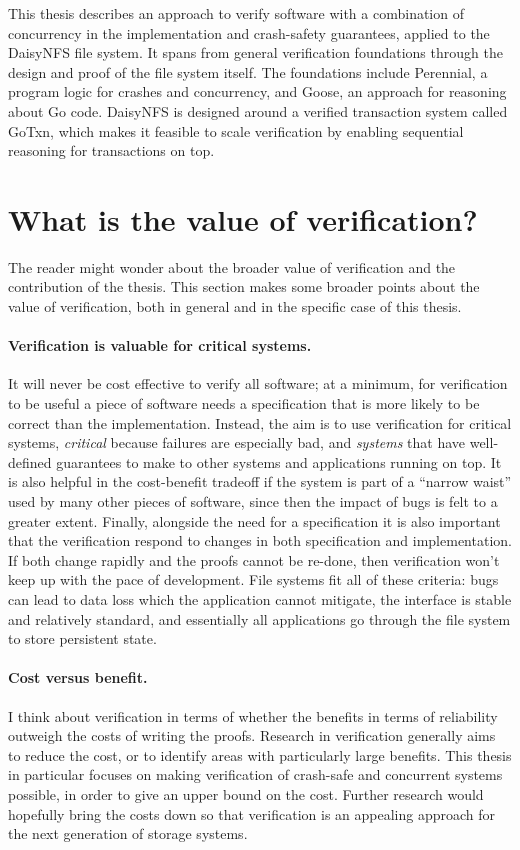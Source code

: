 This thesis describes an approach to verify software with a combination of
concurrency in the implementation and crash-safety guarantees, applied to the
DaisyNFS file system. It spans from general verification foundations
through the design and proof of the file system itself. The foundations
include Perennial, a program logic for crashes and concurrency, and Goose, an
approach for reasoning about Go code. DaisyNFS is designed around a verified
transaction system called GoTxn, which makes it feasible to scale verification
by enabling sequential reasoning for transactions on top.

\section{What is the value of verification?}

The reader might wonder about the broader value of verification and the
contribution of the thesis. This section makes some broader points about the
value of verification, both in general and in the specific case of this thesis.

\paragraph{Verification is valuable for critical systems.} It will never be cost
effective to verify all software; at a minimum, for verification to be useful a
piece of software needs a specification that is more likely to be correct than
the implementation.
Instead, the aim is to use verification for critical systems, \emph{critical}
because failures are especially bad, and \emph{systems} that have well-defined
guarantees to make to other systems and applications running on top. It is also
helpful in the cost-benefit tradeoff if the system is part of a ``narrow waist''
used by many other pieces of software, since then the impact of bugs is felt to
a greater extent. Finally, alongside the need for a specification it is also
important that the verification respond to changes in both specification and
implementation. If both change rapidly and the proofs cannot be re-done, then
verification won't keep up with the pace of development. File systems fit all of
these criteria: bugs can lead to data loss which the application cannot
mitigate, the interface is stable and relatively standard, and essentially all
applications go through the file system to store persistent state.

\paragraph{Cost versus benefit.}
I think about verification in terms of whether the benefits in terms of
reliability outweigh the costs of writing the proofs. Research in verification
generally aims to reduce the cost, or to identify areas with particularly large
benefits. This thesis in particular focuses on making verification of crash-safe
and concurrent systems possible, in order to give an upper bound on the cost.
Further research would hopefully bring the costs down so that verification is an
appealing approach for the next generation of storage systems.

